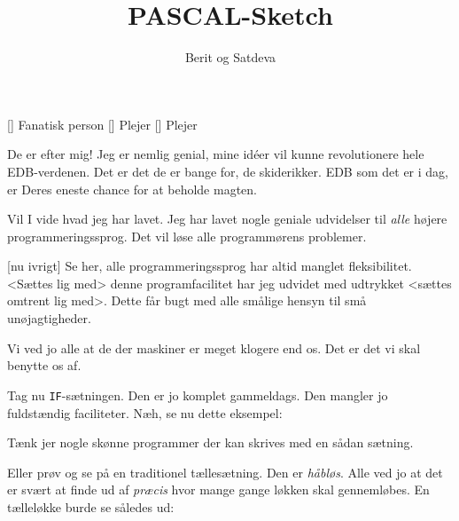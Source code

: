 \documentclass[a4paper,11pt]{article}
\title{PASCAL-Sketch}
\author{Berit og Satdeva}
\begin{document}
\maketitle

\begin{roles}
[] Fanatisk person
[] Plejer
[] Plejer
\end{roles}

\begin{sketch}


   De er efter mig! Jeg er nemlig genial, mine idéer vil kunne
  revolutionere hele EDB-verdenen.  Det er det de er bange for, de
  skiderikker.  EDB som det er i dag, er Deres eneste chance for at
  beholde magten.


   Vil I vide hvad jeg har lavet.  Jeg har lavet nogle geniale
  udvidelser til {\em alle} højere programmeringssprog.  Det vil løse
  alle programmørens problemer.

  [nu ivrigt] Se her, alle programmeringssprog har altid
  manglet fleksibilitet.  <Sættes lig med> denne programfacilitet har
  jeg udvidet med udtrykket <sættes omtrent lig med>.  Dette får bugt
  med alle smålige hensyn til små unøjagtigheder.

   Vi ved jo alle at de der maskiner er meget klogere end os.
  Det er det vi skal benytte os af.

   Tag nu {\tt IF}-sætningen.  Den er jo komplet gammeldags.
  Den mangler jo fuldstændig faciliteter.  Næh, se nu dette eksempel:


 Tænk jer nogle skønne programmer der kan skrives med en sådan
sætning.

 Eller prøv og se på en traditionel tællesætning.  Den er {\em
  håbløs}.  Alle ved jo at det er svært at finde ud af {\em præcis}
hvor mange gange løkken skal gennemløbes.  En tælleløkke burde se
således ud:


\end{sketch}
\end{document}
